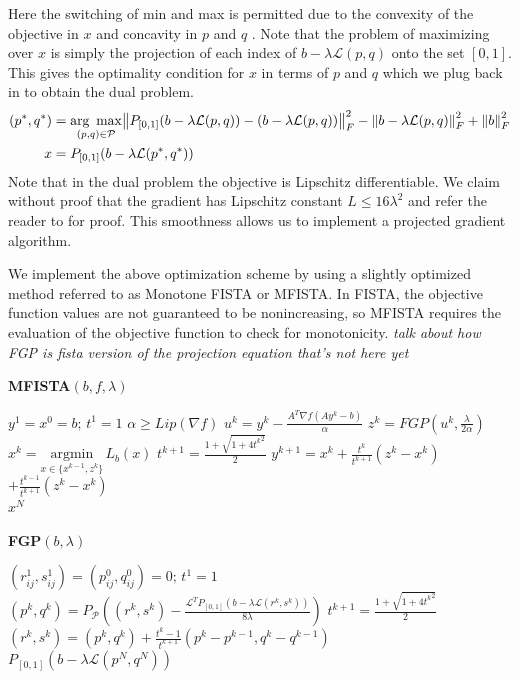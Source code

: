 \documentclass[10pt,a4paper]{article}
\begin{document}
Here the switching of min and max is permitted due to the convexity of the objective in $x$ and concavity in $p$ and $q$ \cite{TV}.  Note that the problem of maximizing over $x$ is simply the projection of each index of  $b- \lambda\mathcal{L}(p,q)$ onto the set $[0,1]$.  This gives the optimality condition for $x$ in terms of $p$ and $q$ which we plug back in to obtain the dual problem.
\begin{align*}
(p^*,q^*) &= \underset{(p,q) \in \mathcal{P}}{\text{arg }\max}  \norm{P_{[0,1]}(b- \lambda\mathcal{L}(p,q)) -(b- \lambda\mathcal{L}(p,q))}_F^2 - \norm{b- \lambda\mathcal{L}(p,q)}_F^2+ \norm{b}_F^2\\
x &= P_{[0,1]}(b- \lambda\mathcal{L}(p^*,q^*))
\end{align*}
Note that in the dual problem the objective is Lipschitz differentiable.  We claim without proof that the gradient has Lipschitz constant $L \leq 16 \lambda^2$ and refer the reader to \cite{TV} for proof.  This smoothness allows us to implement a projected gradient algorithm.

We implement the above optimization scheme by using a slightly optimized method referred to as Monotone FISTA or MFISTA. In FISTA, the objective function values are not guaranteed to be nonincreasing, so MFISTA requires the evaluation of the objective function to check for monotonicity. \emph{talk about how FGP is fista version of the projection equation that's not here yet}
\begin{framed}
\begin{minipage}{0.48\textwidth}
\textbf{MFISTA$(b,f, \lambda)$}
\begin{algorithmic}
\State $y^1 = x^0 = b; \, t^1 = 1$
\State $\alpha \geq Lip(\nabla f)$
	\State $u^k = y^k - \frac{A^T\nabla f (A y^k - b)}{\alpha}$
	\State $z^k = FGP(u^k, \frac{\lambda}{2 \alpha})$
	\State $x^k = \underset{x \in \{x^{k-1},z^k\}}{\text{argmin}} \,L_b(x)$
	\State $t^{k+1} = \frac{1 + \sqrt{1 + 4{t^k}^2}}{2}$ 
	\State $y^{k+1} = x^k + \frac{t^k}{t^{k+1}}(z^k - x^k)$ 
	\State \hspace{10 mm}$+ \frac{t^{k-1}}{t^{k+1}}(z^k - x^k) $
\EndFor\\
\Return $x^N$
\end{algorithmic}
\end{minipage}
\begin{minipage}{0.48\textwidth}

\textbf{FGP$(b, \lambda)$}
\begin{algorithmic}
\State $(r_{ij}^1, s_{ij}^1) = (p_{ij}^0, q_{ij}^0) = 0; \, t^1 = 1$
	\State $(p^k,q^k) = P_\mathcal{P} \left( (r^k,s^k) - \frac{\mathcal{L}^TP_{[0,1]} (b - \lambda \mathcal{L}(r^k,s^k))}{8\lambda} \right)$
	\State $t^{k+1} = \frac{1 + \sqrt{1 + 4{t^k}^2}}{2}$ 
	\State $(r^k,s^k) = (p^k,q^k) + \frac{t^k-1}{t^{k+1}}(p^k-p^{k-1}, q^k-q^{k-1})$ 
\EndFor \\
\Return $P_{[0,1]} (b - \lambda \mathcal{L}(p^N,q^N))$
\end{algorithmic}

\end{minipage}
\end{framed}
\end{document}
